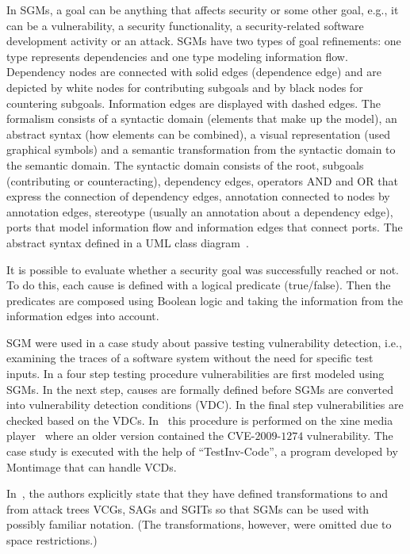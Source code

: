 \documentclass[a4paper]{article}
\begin{document}
In SGMs, a goal can be anything that affects security or some other goal, e.g.,
it can be a vulnerability, a security functionality, a security-related software
development activity or an attack. SGMs have two types of goal refinements: one
type represents dependencies and one type modeling information flow. Dependency
nodes are connected with solid edges (dependence edge) and are depicted by white
nodes for contributing subgoals and by black nodes for countering subgoals.
Information edges are displayed with dashed edges. The formalism consists of a
syntactic domain (elements that make up the model), an abstract syntax (how
elements can be combined), a visual representation (used graphical symbols) and
a semantic transformation from the syntactic domain to the semantic domain. The
syntactic domain consists of the root, subgoals (contributing or counteracting),
dependency edges, operators AND and OR that express the connection of dependency
edges, annotation connected to nodes by annotation edges, stereotype (usually an
annotation about a dependency edge), ports that model information flow and
information edges that connect ports. The abstract syntax defined in a UML class
diagram~\cite{ShMaOcByCaArJi}.

It is possible to evaluate whether a security goal was successfully reached or
not. To do this, each cause is defined with a logical predicate (true/false).
Then the predicates are composed using Boolean logic and taking the
information from the information edges into account.

SGM were used in a case study about passive testing vulnerability detection,
i.e., examining the traces of a software system without the need for specific
test inputs. In a four step testing procedure vulnerabilities are first modeled
using SGMs. In the next step, causes are formally defined before SGMs are
converted into vulnerability detection conditions (VDC). In the final step
vulnerabilities are checked based on the VDCs. In~\cite{ShMaOcByCaArJi} this
procedure is performed on the xine media player~\cite{Website_xine} where an
older version contained the CVE-$2009$-$1274$ vulnerability. The case study is
executed with the help of ``TestInv-Code'', a program developed by Montimage
that can handle VCDs.

In~\cite{BySh}, the authors explicitly state that they have defined
transformations to and from attack trees VCGs, SAGs and SGITs so that SGMs can
be used with possibly familiar notation. (The transformations, however, were
omitted due to space restrictions.)
\end{document}
